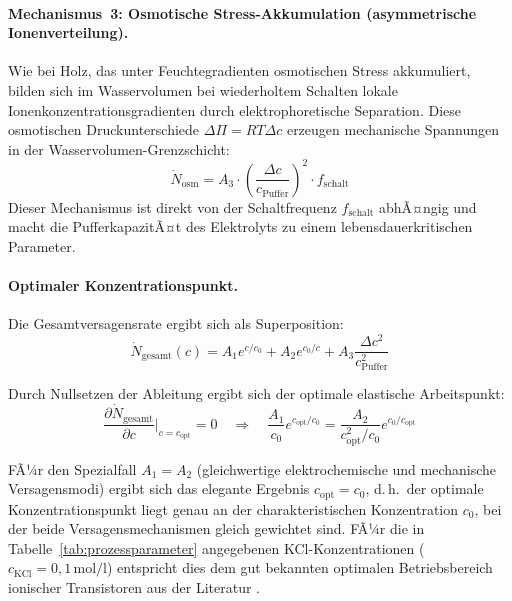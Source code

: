 ﻿\documentclass[a4paper,12pt]{scrreprt}
\theoremstyle{definition}
\begin{document}
\paragraph{Mechanismus~3: Osmotische Stress-Akkumulation (asymmetrische Ionenverteilung).}
Wie bei Holz, das unter Feuchtegradienten osmotischen Stress akkumuliert,
bilden sich im Wasservolumen bei wiederholtem Schalten lokale
Ionenkonzentrationsgradienten durch elektrophoretische Separation.
Diese osmotischen Druckunterschiede $\Delta \Pi = RT \Delta c$ erzeugen
mechanische Spannungen in der Wasservolumen-Grenzschicht:
\begin{equation}
	\dot{N}_{\mathrm{osm}} = A_3 \cdot \left(\frac{\Delta c}{c_{\mathrm{Puffer}}}\right)^2
	\cdot f_{\mathrm{schalt}}
	\label{eq:versagen_osm}
\end{equation}
Dieser Mechanismus ist direkt von der Schaltfrequenz $f_{\mathrm{schalt}}$
abhÃ¤ngig und macht die PufferkapazitÃ¤t des Elektrolyts zu einem
lebensdauerkritischen Parameter.

\paragraph{Optimaler Konzentrationspunkt.}
Die Gesamtversagensrate ergibt sich als Superposition:
\begin{equation}
	\dot{N}_{\mathrm{gesamt}}(c) = A_1 e^{c/c_0} + A_2 e^{c_0/c} + A_3 \frac{\Delta c^2}{c_{\mathrm{Puffer}}^2}
	\label{eq:gesamt_versagen}
\end{equation}

Durch Nullsetzen der Ableitung ergibt sich der optimale elastische
Arbeitspunkt:
\begin{equation}
	\frac{\partial \dot{N}_{\mathrm{gesamt}}}{\partial c}\bigg|_{c = c_{\mathrm{opt}}} = 0
	\quad \Rightarrow \quad
	\frac{A_1}{c_0} e^{c_{\mathrm{opt}}/c_0} = \frac{A_2}{c_{\mathrm{opt}}^2 / c_0} e^{c_0/c_{\mathrm{opt}}}
	\label{eq:arbeitspunkt}
\end{equation}

FÃ¼r den Spezialfall $A_1 = A_2$ (gleichwertige elektrochemische und mechanische
Versagensmodi) ergibt sich das elegante Ergebnis $c_{\mathrm{opt}} = c_0$,
d.\,h.\ der optimale Konzentrationspunkt liegt genau an der charakteristischen
Konzentration $c_0$, bei der beide Versagensmechanismen gleich gewichtet sind.
FÃ¼r die in Tabelle~\ref{tab:prozessparameter} angegebenen KCl-Konzentrationen
($c_{\mathrm{KCl}} = 0{,}1\,\mathrm{mol/l}$) entspricht dies dem gut bekannten
optimalen Betriebsbereich ionischer Transistoren aus der Literatur
\cite{xu2021, maas2020}.
\end{document}
